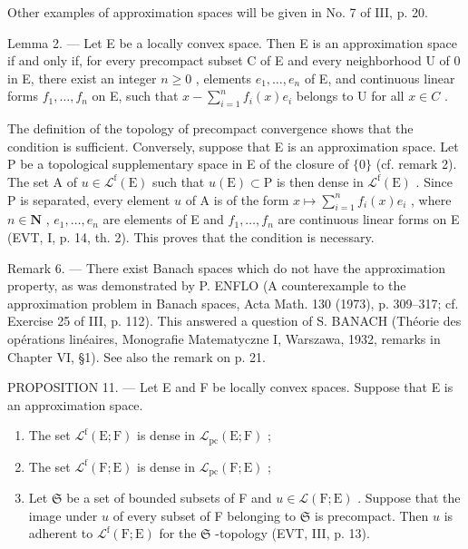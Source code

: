 Other examples of approximation spaces will be given in No. 7 of III, p. 20.

Lemma 2. --- Let E be a locally convex space. Then E is an approximation space if and only if, for every precompact subset C of E and every neighborhood U of 0 in E, there exist an integer \(n \geqslant 0\) , elements \(e_{1}, \ldots, e_{n}\) of E, and continuous linear forms \(f_{1}, \ldots, f_{n}\) on E, such that \(x - \sum_{i=1}^{n} f_{i}(x)e_{i}\) belongs to U for all \(x \in C\) .

The definition of the topology of precompact convergence shows that the condition is sufficient. Conversely, suppose that E is an approximation space. Let P be a topological supplementary space in E of the closure of \(\{0\}\) (cf. remark 2). The set A of \(u \in \mathcal{L}^{\mathrm{f}}(\mathrm{E})\) such that \(u(\mathrm{E}) \subset \mathrm{P}\) is then dense in \(\mathcal{L}^{\mathrm{f}}(\mathrm{E})\) . Since P is separated, every element \(u\) of A is of the form \(x \mapsto \sum_{i=1}^{n} f_i(x)e_i\) , where \(n \in \mathbf{N}\) , \(e_1, \ldots, e_n\) are elements of E and \(f_1, \ldots, f_n\) are continuous linear forms on E (EVT, I, p. 14, th. 2). This proves that the condition is necessary.

Remark 6. --- There exist Banach spaces which do not have the approximation property, as was demonstrated by P. ENFLO (A counterexample to the approximation problem in Banach spaces, Acta Math. 130 (1973), p. 309--317; cf. Exercise 25 of III, p. 112). This answered a question of S. BANACH (Théorie des opérations linéaires, Monografie Matematyczne I, Warszawa, 1932, remarks in Chapter VI, §1). See also the remark on p. 21.

PROPOSITION 11. --- Let E and F be locally convex spaces. Suppose that E is an approximation space.

\begin{enumerate}
\def\labelenumi{\alph{enumi})}
\item
  The set \(\mathcal{L}^{\mathrm{f}}(\mathrm{E};\mathrm{F})\) is dense in \(\mathcal{L}_{\mathrm{pc}}(\mathrm{E};\mathrm{F})\) ;
\item
  The set \(\mathcal{L}^{\mathrm{f}}(\mathrm{F};\mathrm{E})\) is dense in \(\mathcal{L}_{\mathrm{pc}}(\mathrm{F};\mathrm{E})\) ;
\item
  Let \(\mathfrak{S}\) be a set of bounded subsets of F and \(u \in \mathcal{L}(\mathrm{F};\mathrm{E})\) . Suppose that the image under \(u\) of every subset of F belonging to \(\mathfrak{S}\) is precompact. Then \(u\) is adherent to \(\mathcal{L}^{\mathrm{f}}(\mathrm{F};\mathrm{E})\) for the \(\mathfrak{S}\) -topology (EVT, III, p. 13).
\end{enumerate}

